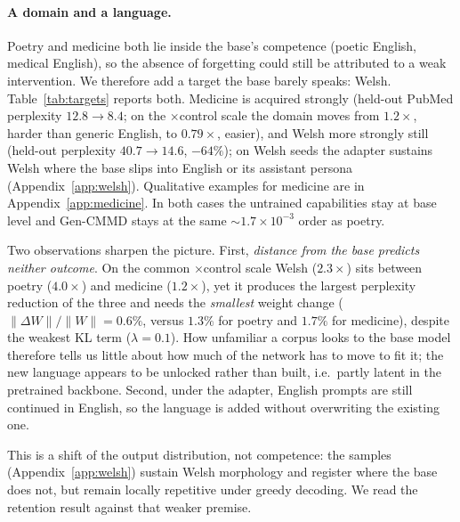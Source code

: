 \documentclass{article}
\begin{document}
\paragraph{A domain and a language.}
Poetry and medicine both lie inside the base's competence (poetic English,
medical English), so the absence of forgetting could still be attributed to a
weak intervention. We therefore add a target the base barely speaks: Welsh.
Table~\ref{tab:targets} reports both. Medicine is acquired strongly (held-out
PubMed perplexity $12.8\to8.4$; on the $\times$control scale the domain moves
from $1.2\times$, harder than generic English, to $0.79\times$, easier), and
Welsh more strongly still (held-out perplexity $40.7\to14.6$, $-64\%$); on Welsh
seeds the adapter sustains Welsh where the base slips into English or its
assistant persona (Appendix~\ref{app:welsh}). Qualitative examples for medicine
are in Appendix~\ref{app:medicine}. In both cases the untrained capabilities stay
at base level and Gen-CMMD stays at the same $\sim\!1.7\times10^{-3}$ order as
poetry.

Two observations sharpen the picture. First, \emph{distance from the base
predicts neither outcome}. On the common $\times$control scale Welsh ($2.3\times$)
sits between poetry ($4.0\times$) and medicine ($1.2\times$), yet it produces the
largest perplexity reduction of the three and needs the \emph{smallest} weight
change ($\lVert\Delta W\rVert/\lVert W\rVert=0.6\%$, versus $1.3\%$ for poetry
and $1.7\%$ for medicine), despite the weakest KL term ($\lambda=0.1$). How
unfamiliar a corpus looks to the base model therefore tells us little about how
much of the network has to move to fit it; the new language appears to be
unlocked rather than built, i.e.\ partly latent in the pretrained backbone.
Second, under the adapter, English prompts are still continued in English, so the
language is added without overwriting the existing one.

This is a shift of the output distribution, not competence: the samples
(Appendix~\ref{app:welsh}) sustain Welsh morphology and register where the base
does not, but remain locally repetitive under greedy decoding. We read the
retention result against that weaker premise.
\end{document}
